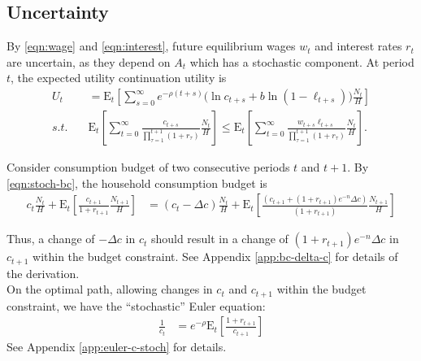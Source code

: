 \documentclass{article}
\newcommand{\Et}[1]{\mathrm{E}_t\left[#1\right]}
\begin{document}
    \subsection{Uncertainty}
    
        By  \eqref{eqn:wage} and \eqref{eqn:interest}, future equilibrium wages $w_t$ and interest rates $r_t$ are uncertain, as they depend on $A_t$ which has a stochastic component. At period $t$,
        the expected utility continuation utility is
        \begin{align}
            U_t &= \Et{\sum_{s=0}^\infty e^{-\rho (t+s)}
            \bigg( \ln c_{t+s} + b \ln(1-\ell_{t+s}) \bigg)
            \frac{N_t}{H}}
            \label{eqn:stoch-utility}
            \\ s.t. \quad
             & \Et{\sum_{t=0}^{\infty}
             \frac{c_{t+s}}{\prod_{\tau=1}^{{t+1}}(1+r_\tau)}
             \frac{N_t}{H}} \le
            \Et{\sum_{t=0}^{\infty}
            \frac{w_{t+s} \ell_{t+s}}{\prod_{\tau=1}^{{t+1}}(1+r_\tau)}
            \frac{N_t}{H}}.
            \label{eqn:stoch-bc}
        \end{align}
        
        Consider consumption budget of two consecutive periods $t$ and $t+1$. By \eqref{eqn:stoch-bc}, the household consumption budget is
        \begin{align}
            c_{t}\frac{N_{t}}{H} + \Et{\frac{c_{t+1}}{1+r_{t+1}}\frac{N_{t+1}}{H}}
            &= (c_{t} - \Delta c)\frac{N_{t}}{H}
            + \Et{\frac{(c_{t+1} + (1+r_{t+1})e^{-n}\Delta c)}{(1+r_{t+1})} \frac{N_{t+1}}{H}}
            \label{eqn:bc-delta-c}
        \end{align}
        
        Thus, a change of $-\Delta c$ in  $c_t$ should result in a change of $(1+r_{t+1}) e^{-n} \Delta c$ in $c_{t+1}$ within the budget constraint. See Appendix \ref{app:bc-delta-c} for details of the derivation. \\
        
        On the optimal path, allowing changes in $c_t$ and $c_{t+1}$ within the budget constraint, we have the ``stochastic'' Euler equation:
        \begin{align}
            \frac{1}{c_t}
            &= e^{-\rho} \Et{\frac{1+r_{t+1}}{c_{t+1}}}
            \label{eqn:euler-c-stoch}
        \end{align}
        See Appendix \eqref{app:euler-c-stoch} for details.
        
\end{document}
